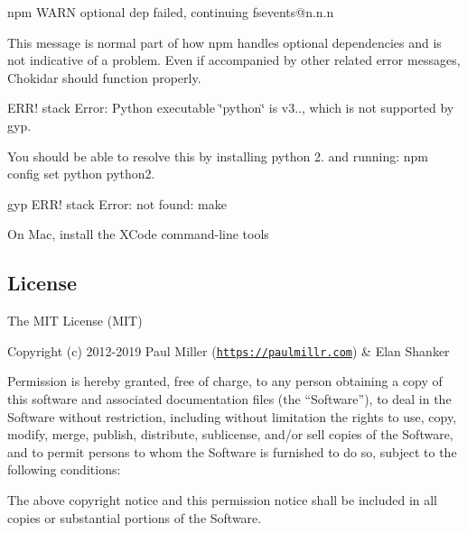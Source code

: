 \begin{DoxyItemize}
\item {\ttfamily npm W\+A\+RN optional dep failed, continuing fsevents@n.\+n.\+n}
\begin{DoxyItemize}
\item This message is normal part of how {\ttfamily npm} handles optional dependencies and is not indicative of a problem. Even if accompanied by other related error messages, Chokidar should function properly.
\end{DoxyItemize}
\item {\ttfamily E\+R\+R! stack Error\+: Python executable \char`\"{}python\char`\"{} is v3.., which is not supported by gyp.}
\begin{DoxyItemize}
\item You should be able to resolve this by installing python 2. and running\+: {\ttfamily npm config set python python2.}
\end{DoxyItemize}
\item {\ttfamily gyp E\+R\+R! stack Error\+: not found\+: make}
\begin{DoxyItemize}
\item On Mac, install the X\+Code command-\/line tools
\end{DoxyItemize}
\end{DoxyItemize}

\subsection*{License}

The M\+IT License (M\+IT)

Copyright (c) 2012-\/2019 Paul Miller (\href{https://paulmillr.com}{\tt https\+://paulmillr.\+com}) \& Elan Shanker

Permission is hereby granted, free of charge, to any person obtaining a copy of this software and associated documentation files (the “\+Software”), to deal in the Software without restriction, including without limitation the rights to use, copy, modify, merge, publish, distribute, sublicense, and/or sell copies of the Software, and to permit persons to whom the Software is furnished to do so, subject to the following conditions\+:

The above copyright notice and this permission notice shall be included in all copies or substantial portions of the Software.

